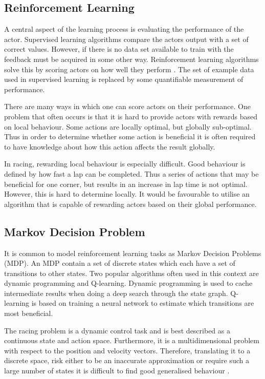\subsection{Reinforcement Learning}
\label{theory:reinforcement_learning}
A central aspect of the learning process is evaluating the performance of the actor. Supervised learning algorithms compare the actors output with a set of correct values. However, if there is no data set available to train with the feedback must be acquired in some other way. Reinforcement learning algorithms solve this by scoring actors on how well they perform \cite{whiteson}. The set of example data used in supervised learning is replaced by some quantifiable measurement of performance.

There are many ways in which one can score actors on their performance. One problem that often occurs is that it is hard to provide actors with rewards based on local behaviour. Some actions are locally optimal, but globally sub-optimal. Thus in order to determine whether some action is beneficial it is often required to have knowledge about how this action affects the result globally.

In racing, rewarding local behaviour is especially difficult. Good behaviour is defined by how fast a lap can be completed. Thus a series of actions that may be beneficial for one corner, but results in an increase in lap time is not optimal. However, this is hard to determine locally. It would be favourable to utilise an algorithm that is capable of rewarding actors based on their global performance.

\subsection{Markov Decision Problem}
It is common to model reinforcement learning tasks as Markov Decision Problems (MDP). An MDP contain a set of discrete states which each have a set of transitions to other states. Two popular algorithms often used in this context are dynamic programming and Q-learning. Dynamic programming is used to cache intermediate results when doing a deep search through the state graph. Q-learning is based on training a neural network to estimate which transitions are most beneficial. 

The racing problem is a dynamic control task and is best described as a continuous state and action space. Furthermore, it is a multidimensional problem with respect to the position and velocity vectors. Therefore, translating it to a discrete space, risk either to be an inaccurate approximation or require such a large number of states it is difficult to find good generalised behaviour \cite{smart}. 

